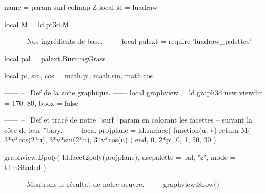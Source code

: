 \documentclass[border = 3pt]{standalone}
\begin{document}
\begin{luadraw*}{name = param-surf-colmap-Z}
local ld = luadraw

local M = ld.pt3d.M

------
-- Nos ingrédients de base.
------
local palext = require 'luadraw_palettes'

local pal = palext.BurningGrass

local pi, sin, cos = math.pi, math.sin, math.cos

------
-- ¨Def de la zone graphique.
------
local graphview = ld.graph3d:new{
  viewdir = {170, 80},
  bbox    = false
}

------
-- ¨Def et tracé de notre ¨surf ¨param en colorant les facettes
-- suivant la côte de leur ¨bary.
------
local projplane = ld.surface(
  function(u, v)
    return M(
      3*v*cos(2*u),
      3*v*sin(2*u),
      3*v*cos(u)
    )
  end,
  0, 2*pi, 0, 1,
  {50, 30}
)

graphview:Dpoly(
  ld.facet2poly(projplane),
  {
    usepalette = {pal, "z"},
    mode       = ld.mShaded
  }
)

------
-- Montrons le résultat de notre oeuvre.
------
graphview:Show()
\end{luadraw*}
\end{document}
